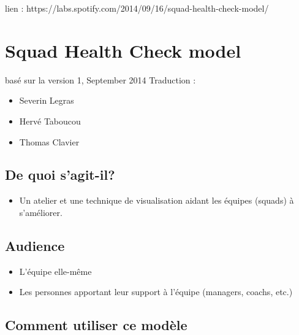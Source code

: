 \documentclass[a4paper]{article}
\begin{document}
lien : https://labs.spotify.com/2014/09/16/squad-health-check-model/


\section{Squad Health Check model}

basé sur la version 1, September 2014
Traduction : 
\begin{itemize}
\item Severin Legras
\item Hervé Taboucou
\item Thomas Clavier
\end{itemize}

\subsection{De quoi s'agit-il?}

\begin{itemize}
\item Un atelier et une technique de visualisation aidant les équipes (squads) à s'améliorer.
\end{itemize}

\subsection{Audience}

\begin{itemize}
\item L'équipe elle-même
\item Les personnes apportant leur support à l'équipe (managers, coachs, etc.)
\end{itemize}

\subsection{Comment utiliser ce modèle}
\end{document}
